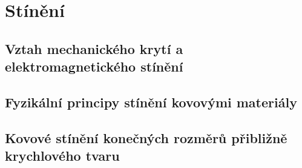   \section{Stínění}\label{emc:IchapIIIsecII}
    \subsection{Vztah mechanického krytí a elektromagnetického stínění}\label{emc:IchapIIIsecIIssecI}
    \subsection{Fyzikální principy stínění kovovými materiály}\label{emc:IchapIIIsecIIssecII}
    \subsection{Kovové stínění konečných rozměrů přibližně krychlového tvaru}\label{emc:IchapIIIsecIIssecIII}

